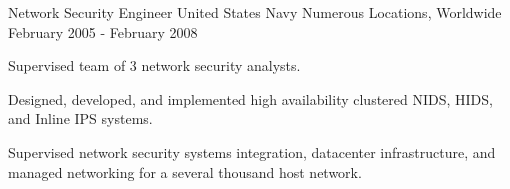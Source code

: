 \begin{cventries}
  \cventry
    {Network Security Engineer} %
    {United States Navy} %
    {Numerous Locations, Worldwide} %
    {February 2005 - February 2008} %
    {
      \begin{cvitems} %
        \item {Supervised team of 3 network security analysts.}
        \item {Designed, developed, and implemented high availability clustered NIDS, HIDS, and Inline IPS systems.}
        \item {Supervised network security systems integration, datacenter infrastructure, and managed networking for a several thousand host network.}
      \end{cvitems}
    }    
\end{cventries}

